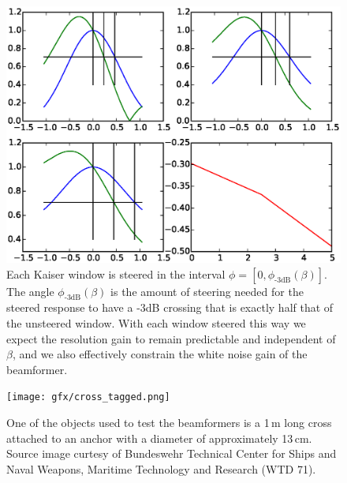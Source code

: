 \documentclass[10pt,journal,draftclsnofoot,onecolumn]{IEEEtran}
\let\MYoriglatexcaption\caption               %
\renewcommand{\caption}[2][\relax]{\MYoriglatexcaption[#2]{#2}}
\newcommand\1{\vec 1}
\begin{document}
\begin{figure}[tbp]%
\includegraphics[width=\linewidth]{gfx/calc_kaiser_3dB.eps}%
\caption{Each Kaiser window is steered in the interval $\phi=[0, \phi_{\text{-3dB}}(\beta)]$. The angle $\phi_{\text{-3dB}}(\beta)$ is the amount of steering needed for the steered response to have a -3dB crossing that is exactly half that of the unsteered window. With each window steered this way we expect the resolution gain to remain predictable and independent of $\beta$, and we also effectively constrain the white noise gain of the beamformer.}\label{windows_steering}
\end{figure}

\begin{figure}[tbp]%
\texttt{[image: gfx/cross\_tagged.png]}%
\caption{One of the objects used to test the beamformers is a 1\,m long cross attached to an anchor with a diameter of approximately 13\,cm. Source image curtesy of Bundeswehr Technical Center for Ships and Naval Weapons, Maritime Technology and Research (WTD 71).}\label{cross}
\end{figure}

\setcounter{topnumber}{1}
\setcounter{dbltopnumber}{1}
\end{document}

